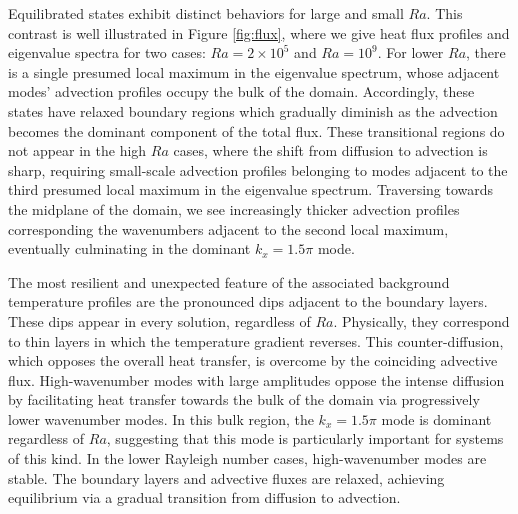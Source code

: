\documentclass[reprint,amsmath,amssymb,aps]{revtex4-1}
\begin{document}
Equilibrated states exhibit distinct behaviors for large and small $Ra$. This contrast is well illustrated in Figure \ref{fig:flux}, where we give heat flux profiles and eigenvalue spectra for two cases: $Ra = 2 \times 10^5$ and $Ra = 10^9$. For lower $Ra$, there is a single presumed local maximum in the eigenvalue spectrum, whose adjacent modes' advection profiles occupy the bulk of the domain. Accordingly, these states have relaxed boundary regions which gradually diminish as the advection becomes the dominant component of the total flux. These transitional regions do not appear in the high $Ra$ cases, where the shift from diffusion to advection is sharp, requiring small-scale advection profiles belonging to modes adjacent to the third presumed local maximum in the eigenvalue spectrum. Traversing towards the midplane of the domain, we see increasingly thicker advection profiles corresponding the wavenumbers adjacent to the second local maximum, eventually culminating in the dominant $k_x = 1.5\pi$ mode.

\par The most resilient and unexpected feature of the associated background temperature profiles are the pronounced dips adjacent to the boundary layers. These dips appear in every solution, regardless of $Ra$. Physically, they correspond to thin layers in which the temperature gradient reverses. This counter-diffusion, which opposes the overall heat transfer, is overcome by the coinciding advective flux. High-wavenumber modes with large amplitudes oppose the intense diffusion by facilitating heat transfer towards the bulk of the domain via progressively lower wavenumber modes. In this bulk region, the $k_x = 1.5\pi$ mode is dominant regardless of $Ra$, suggesting that this mode is particularly important for systems of this kind. In the lower Rayleigh number cases, high-wavenumber modes are stable. The boundary layers and advective fluxes are relaxed, achieving equilibrium via a gradual transition from diffusion to advection.
\end{document}
